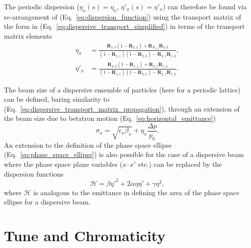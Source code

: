 \documentclass[../main.tex]{subfiles}
\begin{document}
The periodic dispersion ($\eta_{x}\left(s\right)=\eta_{x}$, $\eta'_{x}\left(s\right)=\eta'_{x}$) can therefore be found via re-arrangement of (Eq.~\ref{eq:dispersion_function}) using the transport matrix of the form in (Eq.~\ref{eq:dispersive_transport_simplified}) in terms of the transport matrix elements
\begin{align}
\eta_{x} &= \frac{\boldsymbol{R}_{1,3}\left(1-\boldsymbol{R}_{2,2}\right)+\boldsymbol{R}_{R}_{1,2}\boldsymbol{R}_{2,3}}{\left(1-\boldsymbol{R}_{1,1}\right)\left(1-\boldsymbol{R}_{2,2}\right)-\boldsymbol{R}_{2,1}\boldsymbol{R}_{1,2}},
\label{eq:periodic_dispersion} \\
\eta'_{x} &= \frac{\boldsymbol{R}_{2,3}\left(1-\boldsymbol{R}_{1,1}\right)+\boldsymbol{R}_{2,1}\boldsymbol{R}_{1,3}}{\left(1-\boldsymbol{R}_{1,1}\right)\left(1-\boldsymbol{R}_{2,2}\right)-\boldsymbol{R}_{2,1}\boldsymbol{R}_{1,2}}.
\label{eq:periodic_dispersion_prime}
\end{align}

The beam size of a dispersive ensemble of particles (here for a periodic lattice) can be defined, baring similarity to (Eq.~\ref{eq:dispersive_transport_matrix_propagation}), through an extension of the beam size due to betatron motion (Eq.~\ref{eq:horizontal_emittance})
\begin{equation}
\sigma_{x} = \sqrt{\epsilon_{x}\beta_{x}} + \eta_{x}\frac{\Delta p}{p_{0}}.
\label{eq:dispersive_beam_size}    
\end{equation}
An extension to the definition of the phase space ellipse (Eq.~\ref{eq:phase_space_ellipse}) is also possible for the case of a dispersive beam where the phase space plane variables ($x$--$x'$ etc.) can be replaced by the dispersion functions
\begin{equation}
\mathcal{H} = \beta\eta'^{2}+2\alpha\eta\eta'+\gamma\eta^{2},
\label{eq:dispersive_phase_space_ellipse}    
\end{equation}
where $\mathcal{H}$ is analogous to the emittance in defining the area of the phase space ellipse for a dispersive beam.

\section{Tune and Chromaticity}
\end{document}
